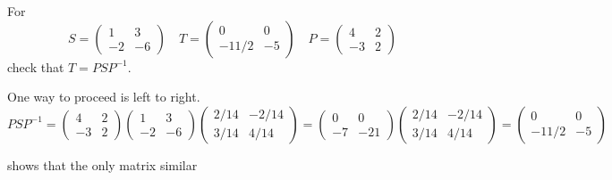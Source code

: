 \begin{exercises}
  \item 
    For
    \begin{equation*}
      S=
      \begin{pmatrix}
        1  &3  \\
       -2  &-6
      \end{pmatrix}
      \quad
      T=
      \begin{pmatrix}
        0    &0  \\
       -11/2 &-5
      \end{pmatrix}
      \quad
      P=
      \begin{pmatrix}
        4  &2  \\
       -3  &2
      \end{pmatrix}
    \end{equation*}
    check that $T=PSP^{-1}$.
    \begin{answer}
      One way to proceed is left to right.
      \begin{equation*}
        PSP^{-1}=
        \begin{pmatrix}
          4  &2  \\
         -3  &2
        \end{pmatrix}
        \begin{pmatrix}
          1  &3  \\
         -2  &-6
        \end{pmatrix}
        \begin{pmatrix}
          2/14  &-2/14  \\
          3/14  &4/14
        \end{pmatrix}
        =
        \begin{pmatrix}
          0  &0  \\
         -7  &-21
        \end{pmatrix}  
        \begin{pmatrix}
          2/14  &-2/14  \\
          3/14  &4/14
        \end{pmatrix}
        =
        \begin{pmatrix}
          0    &0  \\
         -11/2 &-5
        \end{pmatrix}
      \end{equation*}
    \end{answer}
  \recommended \item
     shows that the only matrix similar

\end{exercises}
